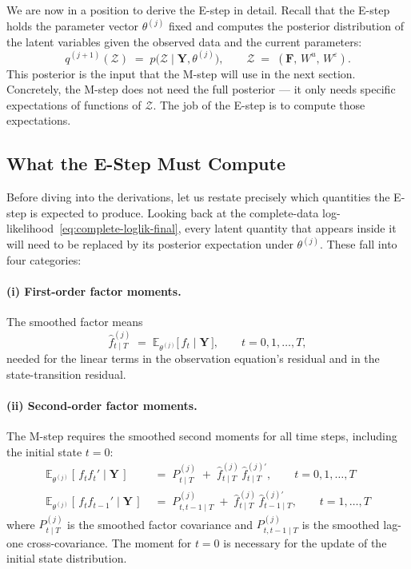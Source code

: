 \documentclass[11pt, a4paper, oneside]{article}
\newcommand{\mY}{\mathbf{Y}}
\newcommand{\mF}{\mathbf{F}}
\begin{document}
We are now in a position to derive the E-step in detail. Recall that the E-step holds the parameter vector
$\theta^{(j)}$ fixed and computes the posterior distribution of the
latent variables given the observed data and the current parameters:
\[
q^{(j+1)}(\mathcal{Z}) \;=\; p\big(\mathcal{Z} \mid \mY, \theta^{(j)}\big),
\qquad
\mathcal{Z} \;=\; (\mF,\, W^u,\, W^\varepsilon).
\]
This posterior is the input that the M-step will use in the next
section. Concretely, the M-step does not need the full posterior — it
only needs specific expectations of functions of $\mathcal{Z}$. The job
of the E-step is to compute those expectations.

\subsection{What the E-Step Must Compute}

Before diving into the derivations, let us restate precisely which
quantities the E-step is expected to produce. Looking back at the
complete-data log-likelihood~\eqref{eq:complete-loglik-final}, every
latent quantity that appears inside it will need to be replaced by its
posterior expectation under $\theta^{(j)}$. These fall into four
categories:

\paragraph{(i) First-order factor moments.}
The smoothed factor means
\[
\hat{f}_{t \mid T}^{(j)} \;=\; \mathbb{E}_{\theta^{(j)}}\!\big[\, f_t \;\big|\; \mY\,\big],
\qquad t = 0, 1, \ldots, T,
\]
needed for the linear terms in the observation equation's residual and
in the state-transition residual.


\paragraph{(ii) Second-order factor moments.}

The M-step requires the smoothed second moments for all time steps, including the initial state $t=0$:
\begin{align*}
\mathbb{E}_{\theta^{(j)}}[\, f_t f_t' \mid \mY\,]
    &\;=\; P_{t \mid T}^{(j)} \;+\; \hat{f}_{t \mid T}^{(j)}\, \hat{f}_{t \mid T}^{(j)\prime}, \qquad t = 0, 1, \dots, T \\[4pt]
\mathbb{E}_{\theta^{(j)}}[\, f_t f_{t-1}' \mid \mY\,]
    &\;=\; P_{t, t-1 \mid T}^{(j)} \;+\; \hat{f}_{t \mid T}^{(j)}\, \hat{f}_{t-1 \mid T}^{(j)\prime}, \qquad t = 1, \dots, T
\end{align*}
where $P_{t \mid T}^{(j)}$ is the smoothed factor covariance and $P_{t, t-1 \mid T}^{(j)}$ is the smoothed lag-one cross-covariance. The moment for $t=0$ is necessary for the update of the initial state distribution.
\end{document}
